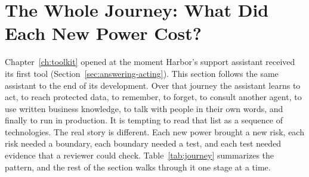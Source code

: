 \section{The Whole Journey: What Did Each New Power Cost?}
\label{sec:journey}

Chapter~\ref{ch:toolkit} opened at the moment Harbor's support assistant received its first tool (Section~\ref{sec:answering-acting}). This section follows the same assistant to the end of its development. Over that journey the assistant learns to act, to reach protected data, to remember, to forget, to consult another agent, to use written business knowledge, to talk with people in their own words, and finally to run in production. It is tempting to read that list as a sequence of technologies. The real story is different. Each new power brought a new risk, each risk needed a boundary, each boundary needed a test, and each test needed evidence that a reviewer could check. Table~\ref{tab:journey} summarizes the pattern, and the rest of the section walks through it one stage at a time.

